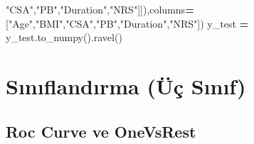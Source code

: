 \documentclass[12pt,twoside]{deuthesis}
\newenvironment{Shaded}{\begin{snugshade}}{\end{snugshade}}
\newcommand{\NormalTok}[1]{#1}
\newcommand{\OperatorTok}[1]{\textcolor[rgb]{0.81,0.36,0.00}{\textbf{#1}}}
\newcommand{\StringTok}[1]{\textcolor[rgb]{0.31,0.60,0.02}{#1}}
\begin{document}
\begin{Shaded}
\begin{Highlighting}[]
\StringTok{"CSA"}\NormalTok{,}\StringTok{"PB"}\NormalTok{,}\StringTok{"Duration"}\NormalTok{,}\StringTok{"NRS"}\NormalTok{]]),columns}\OperatorTok{=}\NormalTok{[}\StringTok{"Age"}\NormalTok{,}\StringTok{"BMI"}\NormalTok{,}\StringTok{"CSA"}\NormalTok{,}\StringTok{"PB"}\NormalTok{,}\StringTok{"Duration"}\NormalTok{,}\StringTok{"NRS"}\NormalTok{])}
\NormalTok{y\_test }\OperatorTok{=}\NormalTok{ y\_test.to\_numpy().ravel()}
\end{Highlighting}
\end{Shaded}
\normalsize

\hypertarget{sux131nux131flandux131rma-uxfcuxe7-sux131nux131f}{%
\chapter{Sınıflandırma (Üç Sınıf)}\label{sux131nux131flandux131rma-uxfcuxe7-sux131nux131f}}

\hypertarget{roc-curve-ve-onevsrest}{%
\section{Roc Curve ve OneVsRest}\label{roc-curve-ve-onevsrest}}
\end{document}
